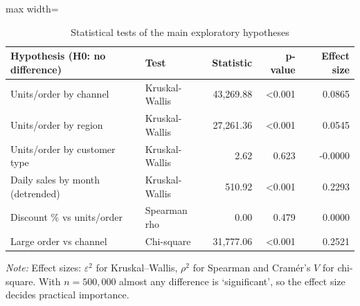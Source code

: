 \begin{table}[htbp]
\centering
\small
\caption{Statistical tests of the main exploratory hypotheses}
\label{tab:tests}
\begin{adjustbox}{max width=\linewidth}
\begin{tabular}{llrrr}
\toprule
\textbf{Hypothesis (H0: no difference)} & \textbf{Test} & \textbf{Statistic} & \textbf{p-value} & \textbf{Effect size} \\
\midrule
Units/order by channel & Kruskal-Wallis & 43,269.88 & <0.001 & 0.0865 \\
Units/order by region & Kruskal-Wallis & 27,261.36 & <0.001 & 0.0545 \\
Units/order by customer type & Kruskal-Wallis & 2.62 & 0.623 & -0.0000 \\
Daily sales by month (detrended) & Kruskal-Wallis & 510.92 & <0.001 & 0.2293 \\
Discount \% vs units/order & Spearman rho & 0.00 & 0.479 & 0.0000 \\
Large order vs channel & Chi-square & 31,777.06 & <0.001 & 0.2521 \\
\bottomrule
\end{tabular}
\end{adjustbox}
\par\smallskip\parbox{0.92\linewidth}{\footnotesize\emph{Note:} Effect sizes: $\varepsilon^2$ for Kruskal--Wallis, $\rho^2$ for Spearman and Cram\'er's $V$ for chi-square. With $n=500{,}000$ almost any difference is `significant', so the effect size decides practical importance.}
\end{table}